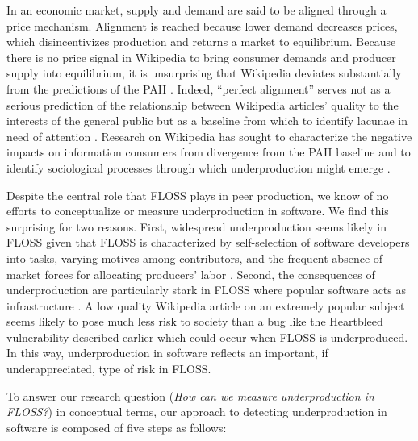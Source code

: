 \documentclass[10pt,conference]{IEEEtran}\usepackage[]{graphicx}\usepackage[usenames,dvipsnames]{color}
\begin{document}
In an economic market, supply and demand are said to be aligned through a price mechanism. Alignment is reached because lower demand decreases prices, which disincentivizes production and returns a market to equilibrium.
Because there is no price signal in Wikipedia to bring consumer demands and producer supply into equilibrium, 
it is unsurprising that Wikipedia deviates substantially from the predictions of the PAH \cite{warncke-wang_misalignment_2015}.
Indeed, ``perfect alignment'' serves not as a serious prediction of the relationship between  Wikipedia articles' quality to the interests of the general public but as a baseline from which to identify lacunae in need of attention \cite{warncke-wang_misalignment_2015}.  Research on Wikipedia has sought to characterize the negative impacts on information consumers from divergence from the PAH baseline and to identify sociological processes through which underproduction might emerge \cite{warncke-wang_misalignment_2015, gorbatai_exploring_2011}.

Despite the central role that FLOSS plays in peer production, we know of no efforts to conceptualize or measure underproduction in software. 
We find this surprising for two reasons. 
First, widespread underproduction seems likely in FLOSS given that FLOSS is characterized by self-selection of software developers into tasks, varying motives among contributors, and the frequent absence of market forces for allocating producers' labor \cite{lakhani_why_2005, crowston_free/libre_2012, oneil_cyberchiefs_2015}. 
Second, the consequences of underproduction are particularly stark in FLOSS where popular software acts as infrastructure \cite{eghbal_roads_2016, eghbal_working_2020}. A low quality Wikipedia article on an extremely popular subject seems likely to pose much less risk to society than a bug like the Heartbleed vulnerability described earlier which could occur when FLOSS is underproduced. 
In this way, underproduction in software reflects an important, if underappreciated, type of risk in FLOSS. 

To answer our research question (\textit{How can we measure underproduction in FLOSS?}) in conceptual terms, our approach to detecting underproduction in software is composed of five steps as follows:
\end{document}
